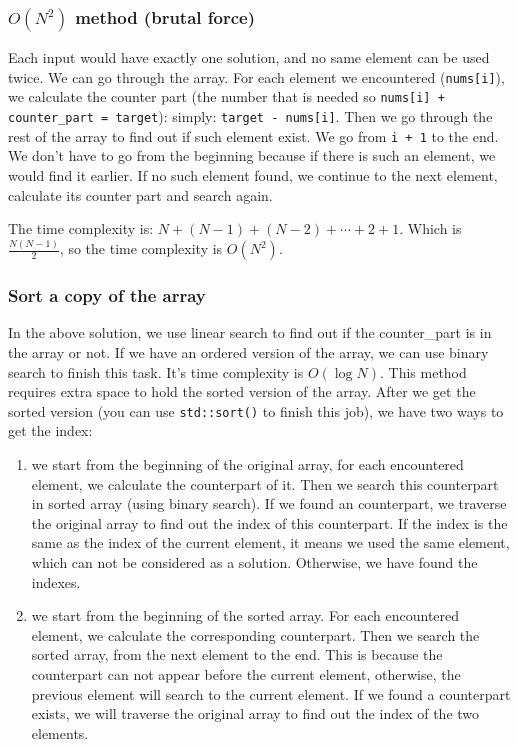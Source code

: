 \documentclass[12pt]{article}
\begin{document}
\subsubsection{\(O(N^2)\) method (brutal force)}
\label{sec:orgc51f434}
Each input would have exactly one solution, and no same element can be used twice. We can go through the array. For each element we encountered (\texttt{nums[i]}), we calculate the counter part (the number that is needed so \texttt{nums[i] + counter\_part = target}): simply: \texttt{target - nums[i]}. Then we go through the rest of the array to find out if such element exist. We go from \texttt{i + 1} to the end. We don't have to go from the beginning because if there is such an element, we would find it earlier. If no such element found, we continue to the next element, calculate its counter part and search again.

The time complexity is: \(N + (N - 1) + (N - 2) + \cdots + 2 + 1\). Which is \(\frac{N(N - 1)}{2}\), so the time complexity is \(O(N^2)\).
\subsubsection{Sort a copy of the array}
\label{sec:org294f545}
In the above solution, we use linear search to find out if the counter\_part is in the array or not. If we have an ordered version of the array, we can use binary search to finish this task. It's time complexity is \(O(\log{N})\). This method requires extra space to hold the sorted version of the array. After we get the sorted version (you can use \texttt{std::sort()} to finish this job), we have two ways to get the index:
\begin{enumerate}
\item we start from the beginning of the original array, for each encountered element, we calculate the counterpart of it. Then we search this counterpart in sorted array (using binary search). If we found an counterpart, we traverse the original array to find out the index of this counterpart. If the index is the same as the index of the current element, it means we used the same element, which can not be considered as a solution. Otherwise, we have found the indexes.
\item we start from the beginning of the sorted array. For each encountered element, we calculate the corresponding counterpart. Then we search the sorted array, from the next element to the end. This is because the counterpart can not appear before the current element, otherwise, the previous element will search to the current element. If we found a counterpart exists, we will traverse the original array to find out the index of the two elements.
\end{enumerate}
\end{document}
